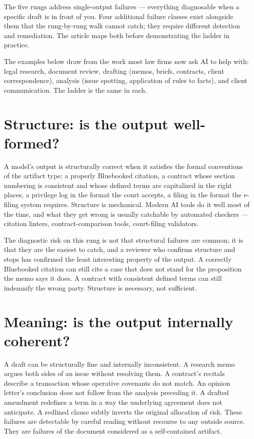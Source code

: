 \documentclass[11pt,a4paper]{article}
\begin{document}
The five rungs address single-output failures --- everything
diagnosable when a specific draft is in front of you. Four
additional failure classes exist alongside them that the
rung-by-rung walk cannot catch; they require different detection
and remediation. The article maps both before demonstrating the
ladder in practice.

The examples below draw from the work most law firms now ask AI to
help with: legal research, document review, drafting (memos,
briefs, contracts, client correspondence), analysis (issue
spotting, application of rules to facts), and client
communication. The ladder is the same in each.

\section*{Structure: is the output well-formed?}

A model's output is structurally correct when it satisfies the
formal conventions of the artifact type: a properly Bluebooked
citation, a contract whose section numbering is consistent and
whose defined terms are capitalized in the right places, a
privilege log in the format the court accepts, a filing in the
format the e-filing system requires. Structure is mechanical.
Modern AI tools do it well most of the time, and what they get
wrong is usually catchable by automated checkers --- citation
linters, contract-comparison tools, court-filing validators.

The diagnostic risk on this rung is not that structural failures
are common; it is that they are the easiest to catch, and a
reviewer who confirms structure and stops has confirmed the least
interesting property of the output. A correctly Bluebooked
citation can still cite a case that does not stand for the
proposition the memo says it does. A contract with consistent
defined terms can still indemnify the wrong party. Structure is
necessary, not sufficient.

\section*{Meaning: is the output internally coherent?}

A draft can be structurally fine and internally inconsistent. A
research memo argues both sides of an issue without resolving
them. A contract's recitals describe a transaction whose
operative covenants do not match. An opinion letter's conclusion
does not follow from the analysis preceding it. A drafted
amendment redefines a term in a way the underlying agreement does
not anticipate. A redlined clause subtly inverts the original
allocation of risk. These failures are detectable by careful
reading without recourse to any outside source. They are failures
of the document considered as a self-contained artifact.
\end{document}
